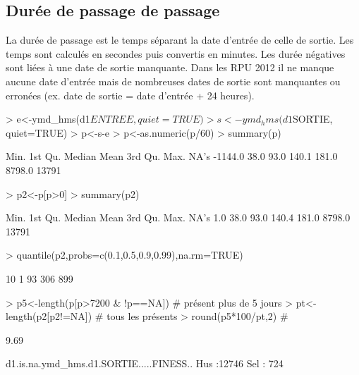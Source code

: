 \documentclass[12pt,english,french]{report}
\begin{document}
%
%
\subsection{Durée de passage de passage}

La durée de passage est le temps séparant la date d'entrée de celle de sortie. Les temps sont calculés en secondes puis convertis en minutes. Les durée négatives sont liées à une date de sortie manquante. Dans les RPU 2012 il ne manque aucune date d'entrée mais de nombreuses dates de sortie sont manquantes ou erronées (ex. date de sortie = date d'entrée + 24 heures).
\begin{Schunk}
\begin{Sinput}
> e<-ymd_hms(d1$ENTREE, quiet=TRUE)
> s<-ymd_hms(d1$SORTIE, quiet=TRUE)
> p<-s-e
> p<-as.numeric(p/60)
> summary(p)
\end{Sinput}
\begin{Soutput}
   Min. 1st Qu.  Median    Mean 3rd Qu.    Max.    NA's 
-1144.0    38.0    93.0   140.1   181.0  8798.0   13791 
\end{Soutput}
\begin{Sinput}
> p2<-p[p>0]
> summary(p2)
\end{Sinput}
\begin{Soutput}
   Min. 1st Qu.  Median    Mean 3rd Qu.    Max.    NA's 
    1.0    38.0    93.0   140.4   181.0  8798.0   13791 
\end{Soutput}
\begin{Sinput}
> quantile(p2,probs=c(0.1,0.5,0.9,0.99),na.rm=TRUE)
\end{Sinput}
\begin{Soutput}
10%
  1  93 306 899 
\end{Soutput}
\begin{Sinput}
> p5<-length(p[p>7200 & !p==NA]) # présent plus de 5 jours
> pt<-length(p2[p2!=NA]) # tous les présents
> round(p5*100/pt,2) # %
\end{Sinput}
\begin{Soutput}
[1] 9.69
\end{Soutput}
\begin{Soutput}
 d1.is.na.ymd_hms.d1.SORTIE.....FINESS..
 Hus    :12746                          
 Sel    :  724                          

\end{Soutput}
\end{Schunk}
\end{document}

